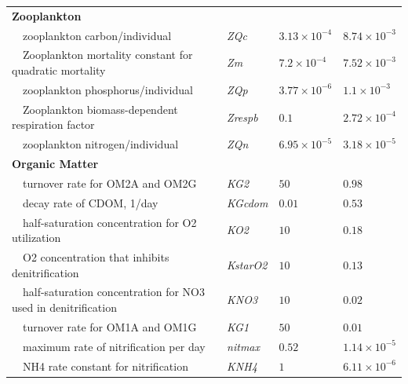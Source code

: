 \documentclass[letterpaper,12pt,oneside]{article}\usepackage[]{graphicx}\usepackage[]{color}
\begin{document}
\begin{table}[!tbp]
{\begin{center}
\begin{tabular}{llll}
\hline
{\bfseries Zooplankton}&&&\tabularnewline
~~zooplankton carbon/individual&\textit{ZQc}&$3.13\times 10^{-4}$&$8.74\times 10^{-3}$\tabularnewline
~~Zooplankton mortality constant for quadratic mortality&\textit{Zm}&$7.2\times 10^{-4}$&$7.52\times 10^{-3}$\tabularnewline
~~zooplankton phosphorus/individual&\textit{ZQp}&$3.77\times 10^{-6}$&$1.1\times 10^{-3}$\tabularnewline
~~Zooplankton biomass-dependent respiration factor&\textit{Zrespb}&$0.1$&$2.72\times 10^{-4}$\tabularnewline
~~zooplankton nitrogen/individual&\textit{ZQn}&$6.95\times 10^{-5}$&$3.18\times 10^{-5}$\tabularnewline
\hline
{\bfseries Organic Matter}&&&\tabularnewline
~~turnover rate for OM2A and OM2G&\textit{KG2}&$50$&$0.98$\tabularnewline
~~decay rate of CDOM, 1/day&\textit{KGcdom}&$0.01$&$0.53$\tabularnewline
~~half-saturation concentration for O2 utilization&\textit{KO2}&$10$&$0.18$\tabularnewline
~~O2 concentration that inhibits denitrification&\textit{KstarO2}&$10$&$0.13$\tabularnewline
~~half-saturation concentration for NO3 used in denitrification&\textit{KNO3}&$10$&$0.02$\tabularnewline
~~turnover rate for OM1A and OM1G&\textit{KG1}&$50$&$0.01$\tabularnewline
~~maximum rate of nitrification per day&\textit{nitmax}&$0.52$&$1.14\times 10^{-5}$\tabularnewline
~~NH4 rate constant for nitrification&\textit{KNH4}&$1$&$6.11\times 10^{-6}$\tabularnewline
\hline
\end{tabular}\end{center}}

\end{table}
\end{document}
